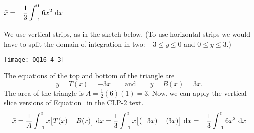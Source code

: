 \begin{answer}
$\displaystyle\bar x = -\frac{1}{3} \int_{-1}^0 6x^2\ \mathrm{d}x$
\end{answer}

\begin{solution}
We use vertical strips, as in the sketch below. (To use horizontal strips
we would have to split the domain of integration in two: $-3\le y\le 0$
and $0\le y\le 3$.)

\begin{center}
   \texttt{[image: OQ16\_4\_3]}
\end{center}

\noindent
The equations of the top and bottom of the triangle are
\begin{equation*}
y = T(x) = -3x \qquad\text{and}\qquad
y = B(x) = 3x.
\end{equation*}
The area of the triangle is $A=\frac12(6)(1)=3$.
Now, we can apply the vertical-slice versions of Equation~
 in the CLP-2 text.
\begin{equation*}
\bar x = \frac{1}{A}\int_{-1}^0 x \big[T(x)- B(x)\big]\ \mathrm{d}x
= \frac{1}{3} \int_{-1}^0 x \big[({-}3x)-(3x)\big]\ \mathrm{d}x
= -\frac{1}{3} \int_{-1}^0 6x^2\ \mathrm{d}x
\end{equation*}

\end{solution}





\subsection*{\Procedural}



